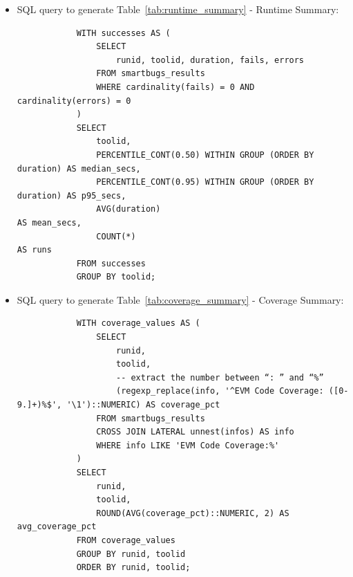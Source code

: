 \documentclass{article}
\begin{document}
\begin{itemize}
		\begin{verbatim}
			WITH truncated_fails AS (
				SELECT
					runid,
					toolid,
				LEFT(fail, 25) AS fail_prefix
				FROM smartbugs_results
				CROSS JOIN LATERAL unnest(fails) AS fail
			)
			SELECT
				runid,
				fail_prefix,
				SUM(CASE WHEN toolid = 'oyente'  THEN 1 ELSE 0 END) AS count_oyente,
				SUM(CASE WHEN toolid = 'oyente+' THEN 1 ELSE 0 END) AS count_oyente_plus
			FROM truncated_fails
			GROUP BY runid, fail_prefix
			ORDER BY runid, fail_prefix;
		\end{verbatim}
		\item SQL query to generate Table~\ref{tab:runtime_summary} - Runtime Summary:
		\begin{verbatim}
			WITH successes AS (
				SELECT
					runid, toolid, duration, fails, errors
				FROM smartbugs_results
				WHERE cardinality(fails) = 0 AND cardinality(errors) = 0
			)
			SELECT
				toolid,
				PERCENTILE_CONT(0.50) WITHIN GROUP (ORDER BY duration) AS median_secs,
				PERCENTILE_CONT(0.95) WITHIN GROUP (ORDER BY duration) AS p95_secs,
				AVG(duration)                                       AS mean_secs,
				COUNT(*)                                            AS runs
			FROM successes
			GROUP BY toolid;
		\end{verbatim}
		\item SQL query to generate Table~\ref{tab:coverage_summary} - Coverage Summary:
		\begin{verbatim}
			WITH coverage_values AS (
				SELECT
					runid,
					toolid,
					-- extract the number between “: ” and “%”
					(regexp_replace(info, '^EVM Code Coverage: ([0-9.]+)%$', '\1')::NUMERIC) AS coverage_pct
				FROM smartbugs_results
				CROSS JOIN LATERAL unnest(infos) AS info
				WHERE info LIKE 'EVM Code Coverage:%'
			)
			SELECT
				runid,
				toolid,
				ROUND(AVG(coverage_pct)::NUMERIC, 2) AS avg_coverage_pct
			FROM coverage_values
			GROUP BY runid, toolid
			ORDER BY runid, toolid;
		\end{verbatim}
	\end{itemize}
\end{document}
